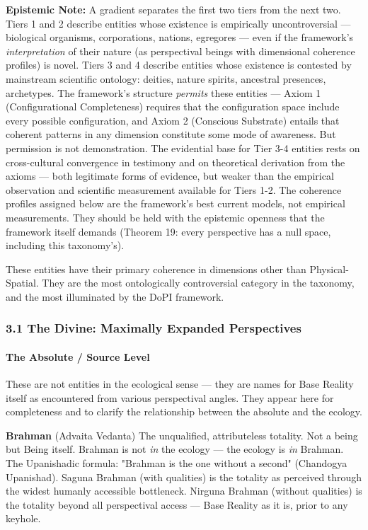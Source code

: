\textbf{Epistemic Note:} A gradient separates the first two tiers from the next two. Tiers 1 and 2 describe entities whose existence is empirically uncontroversial — biological organisms, corporations, nations, egregores — even if the framework's \textit{interpretation} of their nature (as perspectival beings with dimensional coherence profiles) is novel. Tiers 3 and 4 describe entities whose existence is contested by mainstream scientific ontology: deities, nature spirits, ancestral presences, archetypes. The framework's structure \textit{permits} these entities — Axiom 1 (Configurational Completeness) requires that the configuration space include every possible configuration, and Axiom 2 (Conscious Substrate) entails that coherent patterns in any dimension constitute some mode of awareness. But permission is not demonstration. The evidential base for Tier 3-4 entities rests on cross-cultural convergence in testimony and on theoretical derivation from the axioms — both legitimate forms of evidence, but weaker than the empirical observation and scientific measurement available for Tiers 1-2. The coherence profiles assigned below are the framework's best current models, not empirical measurements. They should be held with the epistemic openness that the framework itself demands (Theorem 19: every perspective has a null space, including this taxonomy's).


These entities have their primary coherence in dimensions other than Physical-Spatial. They are the most ontologically controversial category in the taxonomy, and the most illuminated by the DoPI framework.


\subsubsection*{3.1 The Divine: Maximally Expanded Perspectives}


\paragraph*{The Absolute / Source Level}


These are not entities in the ecological sense — they are names for Base Reality itself as encountered from various perspectival angles. They appear here for completeness and to clarify the relationship between the absolute and the ecology.


\textbf{Brahman} (Advaita Vedanta) The unqualified, attributeless totality. Not a being but Being itself. Brahman is not \textit{in} the ecology — the ecology is \textit{in} Brahman. The Upanishadic formula: "Brahman is the one without a second" (Chandogya Upanishad). Saguna Brahman (with qualities) is the totality as perceived through the widest humanly accessible bottleneck. Nirguna Brahman (without qualities) is the totality beyond all perspectival access — Base Reality as it is, prior to any keyhole.


